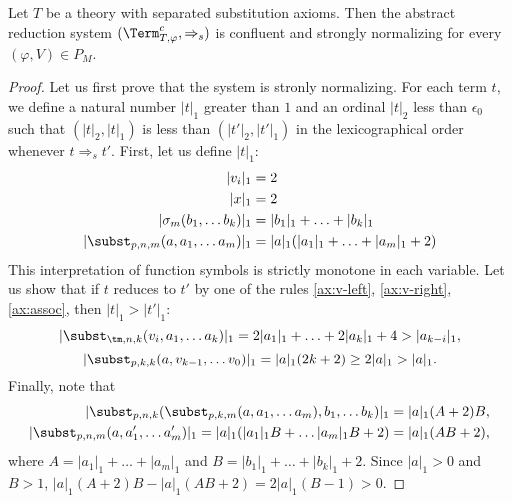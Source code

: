 \begin{lem}
Let $T$ be a theory with separated substitution axioms.
Then the abstract reduction system $(\Term_{T,\varphi}^c,\Rightarrow_s)$ is confluent and strongly normalizing for every $(\varphi,V) \in P_M$.
\end{lem}
\begin{proof}
Let us first prove that the system is stronly normalizing.
For each term $t$, we define a natural number $|t|_1$ greater than $1$ and an ordinal $|t|_2$ less than $\epsilon_0$ such that $(|t|_2,|t|_1)$ is less than $(|t'|_2,|t'|_1)$ in the lexicographical order whenever $t \Rightarrow_s t'$.
First, let us define $|t|_1$:
\begin{align*}
|v_i|_1 & = 2 \\
|x|_1 & = 2 \\
|\sigma_m(b_1, \ldots b_k)|_1 & = |b_1|_1 + \ldots + |b_k|_1 \\
|\subst_{p,n,m}(a, a_1, \ldots a_m)|_1 & = |a|_1 (|a_1|_1 + \ldots + |a_m|_1 + 2)
\end{align*}
This interpretation of function symbols is strictly monotone in each variable.
Let us show that if $t$ reduces to $t'$ by one of the rules \eqref{ax:v-left}, \eqref{ax:v-right}, \eqref{ax:assoc}, then $|t|_1 > |t'|_1$:
\[ |\subst_{\tm,n,k}(v_i, a_1, \ldots a_k)|_1 = 2 |a_1|_1 + \ldots + 2 |a_k|_1 + 4 > |a_{k-i}|_1, \]
\[ |\subst_{p,k,k}(a, v_{k-1}, \ldots v_0)|_1 = |a|_1 (2 k + 2) \geq 2|a|_1 > |a|_1. \]
Finally, note that
\begin{align*}
|\subst_{p,n,k}(\subst_{p,k,m}(a, a_1, \ldots a_m), b_1, \ldots b_k)|_1 & = |a|_1 (A + 2) B, \\
|\subst_{p,n,m}(a, a_1', \ldots a_m')|_1 = |a|_1 (|a_1|_1 B + \ldots |a_m|_1 B + 2) & = |a|_1 (A B + 2),
\end{align*}
where $A = |a_1|_1 + \ldots + |a_m|_1$ and $B = |b_1|_1 + \ldots + |b_k|_1 + 2$.
Since $|a|_1 > 0$ and $B > 1$, $|a|_1 (A + 2) B - |a|_1 (A B + 2) = 2 |a|_1 (B - 1) > 0$.


\end{proof}
